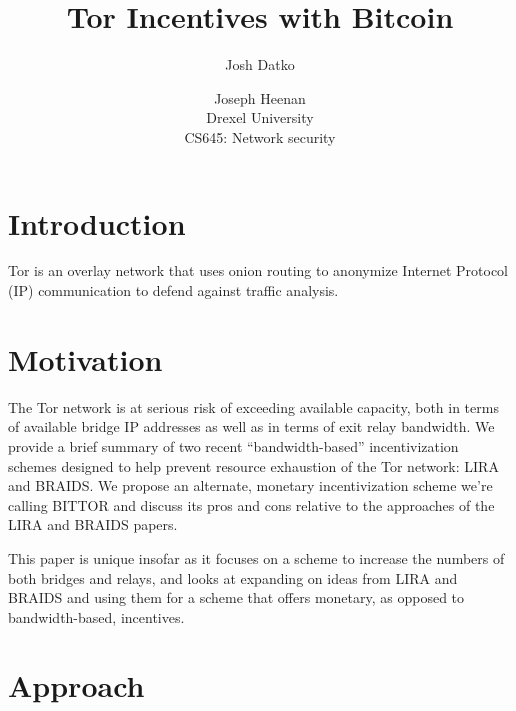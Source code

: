 \documentclass[letterpaper]{article}
\begin{document}
\setcounter{secnumdepth}{1}
\title{Tor Incentives with Bitcoin}
\author{Josh Datko \and Joseph Heenan\\ Drexel University\\
CS645: Network security\\
}
\maketitle



\section{Introduction}\label{sec:intro}

Tor is an overlay network that uses onion routing to anonymize
Internet Protocol (IP) communication to defend against traffic
analysis.


\section{Motivation}\label{sec:motivation}

The Tor network is at serious risk of exceeding available capacity,
both in terms of available bridge IP addresses as well as in terms of
exit relay bandwidth\cite{tor-internet-days}. We provide a brief summary of two recent
“bandwidth-based” incentivization schemes designed to help prevent
resource exhaustion of the Tor network: LIRA and BRAIDS. We propose an
alternate, monetary incentivization scheme we’re calling BITTOR and
discuss its pros and cons relative to the approaches of the LIRA and
BRAIDS papers.

This paper is unique insofar as it focuses on a scheme to increase the
numbers of both bridges and relays, and looks at expanding on ideas
from LIRA and BRAIDS and using them for a scheme that offers monetary,
as opposed to bandwidth-based, incentives.

\section{Approach}\label{sec:approach}
\end{document}

